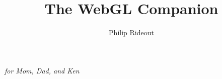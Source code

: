 \documentclass{book}
\title{The WebGL Companion}
\date{}
\author{Philip Rideout}
\begin{document}
\mainmatter

\maketitle
\emph{for Mom, Dad, and Ken}

\newcommand{\rrecipe}[1] {\section{\textcolor{mygreen}{#1} } }
\hypersetup{colorlinks,linkcolor=black}
\newcommand{\summary}[1]{\addtocontents{toc}{\setlength{\leftskip}{15pt} \noindent  \footnotesize\textcolor{mygray}{#1}\normalsize\protect\par}}

\let\cleardoublepage\clearpage

\tableofcontents

\newcommand{\definerecipe}[4]
{
	\vspace{0.1in}
	\marginpar { \raggedright \tiny
		\vspace{0.3in}
		#2
	}
	\section{#1} \ \\
	\addcontentsline{toc}{section}{#1}
	\mbox{ \colorbox{bg}{\begin{minipage}{4in}
	\vspace{0.05in}
	\raggedright \Large \textbf{\thesection\ #1} \normalsize
	\vspace{0.05in}
	\setlength\fboxsep{0pt}
	\begin{tabular}{ l p{2.15in} }
	 \vtop{\vspace{0pt}\hbox{\fbox{\texttt{[image: ../media/screenshots/\#3]}} }} &
	 \vtop{\vspace{0pt}\parbox{2.15in}{\noindent\small\textsf{#4} } }\\
	\end{tabular}
	\vspace{0.05in}
	\end{minipage} } }
	\vspace{0.2in}
}



%
%
%
%

\backmatter
\renewcommand{\chaptermark}[1]{\markboth{#1}{#1}}

\raggedright

%
%
\printindex
\end{document}
